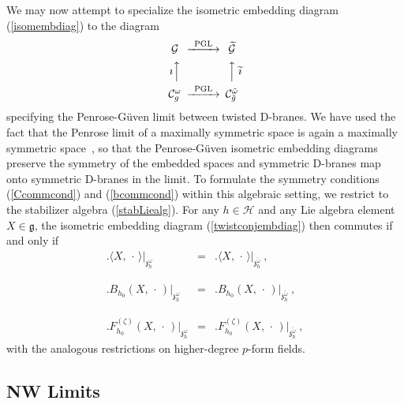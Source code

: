 \documentclass[11pt,a4paper]{article}
\def\nn{\nonumber}
\def\bea{\begin{eqnarray}}
\def\eea{\end{eqnarray}}
\begin{document}
We may now attempt to specialize the isometric embedding diagram
(\ref{isomembdiag}) to the diagram
\begin{equation}
  \begin{CD}
    \mathcal{G} @>\text{PGL}>>                      \widetilde{\mathcal{G}}\\
    \text{$\imath$}@AAA @AAA\text{$\widetilde{\imath}$}\\
    \mathcal{C}_g^\omega @>\text{PGL}>> \mathcal{C}_{\tilde g}^{\tilde\omega}\\
  \end{CD}
\label{twistconjembdiag}\end{equation}
specifying the Penrose-G\"uven limit between twisted D-branes. We have
used the fact that the Penrose limit of a maximally symmetric space is again a
maximally symmetric space~\cite{BFP1}, so that the Penrose-G\"uven isometric
embedding diagrams preserve the symmetry of the embedded spaces and
symmetric D-branes map onto symmetric D-branes in the limit. To
formulate the symmetry conditions (\ref{Ccommcond}) and
(\ref{bcommcond}) within this algebraic setting, we restrict to the
stabilizer algebra (\ref{stabLiealg}).
For any $h\in\mathcal{H}$ and any Lie algebra element
$X\in\mathfrak{g}$, the isometric embedding diagram
(\ref{twistconjembdiag}) then commutes if and only if
\bea
\bigl.\langle X,\,\cdot\,\rangle\bigr|_{\mathfrak{z}_h^\omega}&=&
\bigl.\langle X,\,\cdot\,\rangle\bigr|_{\mathfrak{z}_h^{\tilde\omega}}
\ , \label{innprodtwistcomm}\\{~~~~}_{~~}^{~~}\nn\\\bigl.
B_{h_0}(X,\,\cdot\,)\bigr|_{
\mathfrak{z}_h^\omega}&=&\bigl.B_{h_0}(X,\,\cdot\,)\bigr|_{
\mathfrak{z}_h^{\tilde\omega}} \ , \label{Bfieldtwistcomm}
\\{~~~~}_{~~}^{~~}\nn\\\bigl.F^{(\zeta)}_{h_0}(X,\,\cdot\,)\bigr|_{
\mathfrak{z}_h^\omega}&=&\bigl.F^{(\zeta)}_{h_0}(X,\,\cdot\,)\bigr|_{
\mathfrak{z}_h^{\tilde\omega}} \ ,
\label{Ftwistcomm}\eea
with the analogous restrictions on higher-degree $p$-form fields.

\subsection{NW Limits\label{ApplNW}}
\end{document}
